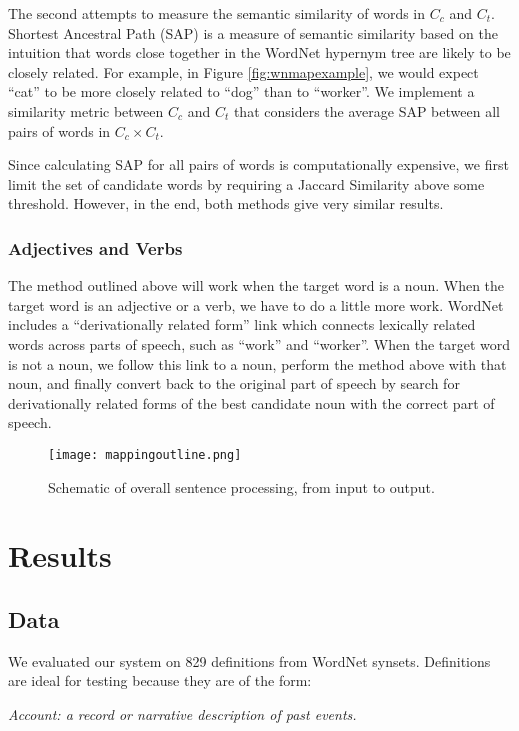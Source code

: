 \documentclass[12pt]{article}
\begin{document}
The second attempts to measure the semantic similarity of words in $C_c$ and $C_t$. Shortest Ancestral Path (SAP) is a measure of semantic similarity based on the intuition that words close together in the WordNet hypernym tree are likely to be closely related. For example, in Figure \ref{fig:wnmapexample}, we would expect ``cat'' to be more closely related to ``dog'' than to ``worker''. We implement a similarity metric between $C_c$ and $C_t$ that considers the average SAP between all pairs of words in $C_c \times C_t$.

Since calculating SAP for all pairs of words is computationally expensive, we first limit the set of candidate words by requiring a Jaccard Similarity above some threshold. However, in the end, both methods give very similar results.

\subsubsection{Adjectives and Verbs}

The method outlined above will work when the target word is a noun. When the target word is an adjective or a verb, we have to do a little more work. WordNet includes a ``derivationally related form'' link which connects lexically related words across parts of speech, such as ``work'' and ``worker''. When the target word is not a noun, we follow this link to a noun, perform the method above with that noun, and finally convert back to the original part of speech by search for derivationally related forms of the best candidate noun with the correct part of speech.

\begin{figure}[h]
	\centering
	\texttt{[image: mappingoutline.png]}
	\caption{Schematic of overall sentence processing, from input to output.}
	\label{fig:mapoutline}
\end{figure}

\section{Results}

\subsection{Data}
We evaluated our system on 829 definitions from WordNet synsets. Definitions are ideal for testing because they are of the form:

\begin{center}
    \emph{Account: a record or narrative description of past events.}
\end{center}
\end{document}
